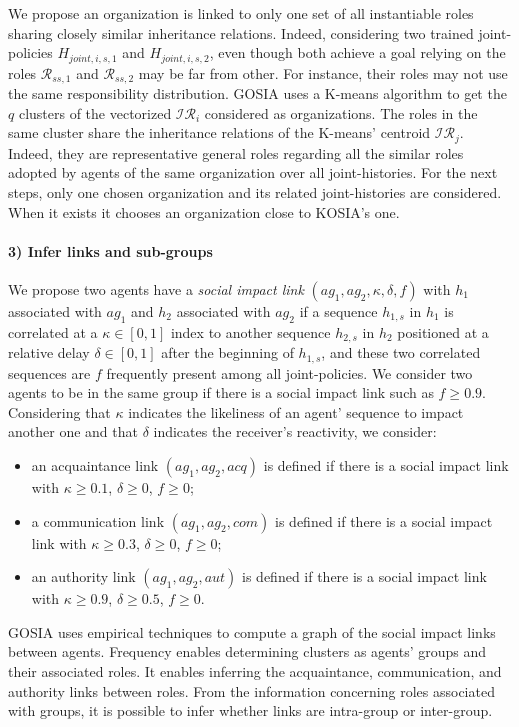 \documentclass[sn-mathphys-num]{sn-jnl}%
\theoremstyle{thmstyleone}%
\theoremstyle{thmstyletwo}%
\theoremstyle{thmstylethree}%
\begin{document}
We propose an organization is linked to only one set of all instantiable roles sharing closely similar inheritance relations. Indeed, considering two trained joint-policies $H_{joint,i,s,1}$ and $H_{joint,i,s,2}$, even though both achieve a goal relying on the roles $\mathcal{R}_{ss,1}$ and $\mathcal{R}_{ss,2}$ may be far from other. For instance, their roles may not use the same responsibility distribution.
GOSIA uses a K-means algorithm to get the $q$ clusters of the vectorized $\mathcal{IR}_{i}$ considered as organizations. The roles in the same cluster share the inheritance relations of the K-means' centroid $\mathcal{IR}_j$. Indeed, they are representative general roles regarding all the similar roles adopted by agents of the same organization over all joint-histories.
For the next steps, only one chosen organization and its related joint-histories are considered. When it exists it chooses an organization close to KOSIA's one.

\paragraph{3) Infer links and sub-groups}

We propose two agents have a \emph{social impact link} $(ag_1,ag_2, \kappa, \delta, f)$ with $h_1$ associated with $ag_1$ and $h_2$ associated with $ag_2$ if a sequence $h_{1,s}$ in $h_1$ is correlated at a $\kappa \in [0,1]$ index to another sequence $h_{2,s}$ in $h_2$ positioned at a relative delay $\delta \in [0,1]$ after the beginning of $h_{1,s}$, and these two correlated sequences are $f$ frequently present among all joint-policies.
We consider two agents to be in the same group if there is a social impact link such as $f \geq 0.9$. Considering that $\kappa$ indicates the likeliness of an agent' sequence to impact another one and that $\delta$ indicates the receiver's reactivity, we consider:
\begin{itemize}
    \item an acquaintance link $(ag_1,ag_2,acq)$ is defined if there is a social impact link with $\kappa \geq 0.1$, $\delta \geq 0$, $f \geq 0$;
    \item a communication link $(ag_1,ag_2,com)$ is defined if there is a social impact link with $\kappa \geq 0.3$, $\delta \geq 0$, $f \geq 0$;
    \item an authority link $(ag_1,ag_2,aut)$ is defined if there is a social impact link with $\kappa \geq 0.9$, $\delta \geq 0.5$, $f \geq 0$.
\end{itemize}
GOSIA uses empirical techniques to compute a graph of the social impact links between agents. Frequency enables determining clusters as agents' groups and their associated roles. It enables inferring the acquaintance, communication, and authority links between roles. From the information concerning roles associated with groups, it is possible to infer whether links are intra-group or inter-group.
\end{document}
